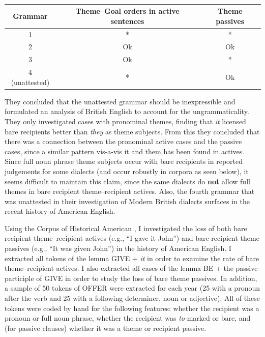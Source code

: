 \begin{exe}
\ex \cite[Table 2]{Haddican.2012}\\
 \begin{tabular}{|c|c|c|}
 \hline
 Grammar & Theme--Goal orders in active sentences & Theme passives\\
 \hline
 1 & * & * \\
 \hline
 2 & Ok & Ok \\
 \hline
 3 & Ok & * \\
 \hline
 4 (unattested) & * & Ok \\
 \hline
 \end{tabular}
\end{exe}%

They concluded that the unattested grammar should be inexpressible and formulated an analysis of British English to account for the ungrammaticality. They only investigated cases with pronominal themes, finding that \textit{it} licensed bare recipients better than \textit{they} as theme subjects. From this they concluded that there was a connection between the pronominal active cases and the passive cases, since a similar pattern vis-a-vis it and them has been found in actives. Since full noun phrase theme subjects occur with bare recipients in reported judgements for some dialects (and occur robustly in corpora as seen below), it seems difficult to maintain this claim, since the same dialects do \textbf{not} allow full themes in bare recipient theme--recipient actives. Also, the fourth grammar that was unattested in their investigation of Modern British dialects surfaces in the recent history of American English.

Using the Corpus of Historical American \citep{Davies.2010}, I investigated the loss of both bare recipient theme--recipient actives (e.g., ``I gave it John'') and bare recipient theme passives (e.g., ``It was given John'') in the history of American English. I extracted all tokens of the lemma GIVE + \textit{it} in order to examine the rate of bare theme--recipient actives. I also extracted all cases of the lemma BE + the passive participle of GIVE in order to study the loss of bare theme passives. In addition, a sample of 50 tokens of OFFER were extracted for each year (25 with a pronoun after the verb and 25 with a following determiner, noun or adjective). All of these tokens were coded by hand for the following features: whether the recipient was a pronoun or full noun phrase, whether the recipient was \textit{to}-marked or bare, and (for passive clauses) whether it was a theme or recipient passive.

